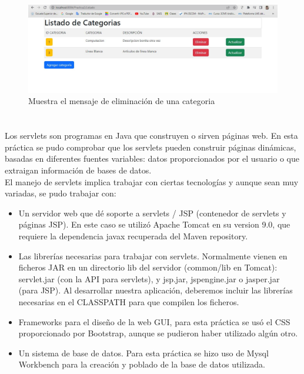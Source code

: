 \documentclass[10pt,a4paper]{article}
\begin{document}
\begin{figure}[H]
	\includegraphics[scale=.54]{Imagenes/mostrarEliminar.jpg}
	\centering \linebreak \linebreak 
	\caption{Muestra el mensaje de eliminación de una categoria}
\end{figure} \hfill 

\section{\color{colorIPN}{Conclusiones}}
\normalsize
{
Los servlets son programas en Java que construyen o sirven páginas web. En esta práctica se pudo comprobar que los servlets pueden construir páginas dinámicas, basadas en diferentes fuentes variables: datos proporcionados por el usuario o que extraigan información de bases de datos.
\\
El manejo de servlets implica trabajar con ciertas tecnologías y aunque sean muy variadas, se pudo trabajar con:
}

\begin{itemize}
\item Un servidor web que dé soporte a servlets / JSP (contenedor de servlets y páginas JSP). En este caso se utilizó Apache Tomcat en su version 9.0, que requiere la dependencia javax recuperada del Maven
repository.
\item Las librerías necesarias para trabajar con servlets. Normalmente vienen en ficheros JAR en un directorio lib del servidor (common/lib en Tomcat): servlet.jar (con la API para servlets), y jsp.jar, jspengine.jar o jasper.jar (para JSP). Al desarrollar nuestra aplicación, deberemos incluir las librerías necesarias en el CLASSPATH para que compilen los ficheros.
\item Frameworks para el diseño de la web GUI, para esta práctica se usó el CSS proporcionado por Bootstrap, aunque se pudieron haber utilizado algún otro.
\item Un sistema de base de datos. Para esta práctica se hizo uso de Mysql Workbench para la creación y poblado de la base de datos utilizada.
\end{itemize}
\end{document}
